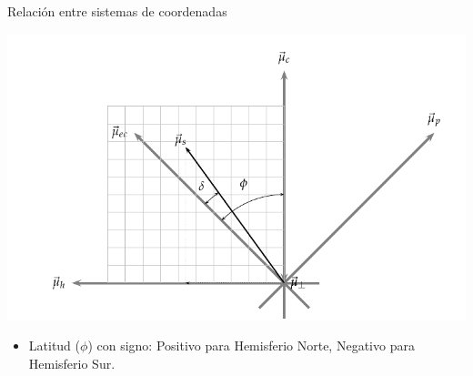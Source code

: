 \documentclass[xcolor={usenames,svgnames,dvipsnames}]{beamer}
\begin{document}
\begin{frame}[label={sec:orgc734592}]{Relación entre sistemas de coordenadas}
\begin{center}
\includegraphics[width=.9\linewidth]{../figs/RelacionSistemasCoordenadas.pdf}
\end{center}

\begin{itemize}
\item \alert{Latitud (\(\phi\)) con signo}: Positivo para Hemisferio Norte, Negativo para Hemisferio Sur.
\end{itemize}
\end{frame}
\end{document}
